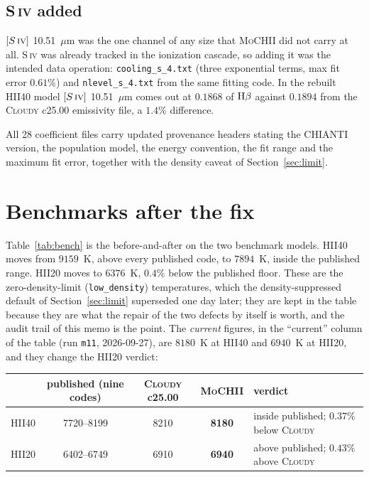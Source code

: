 \documentclass[english,a4paper]{my_memo}
\newcommand{\code}[1]{\texttt{#1}}
\newcommand{\MoCHII}{\textsc{MoCHII}}
\newcommand{\Cloudy}{\textsc{Cloudy}}
\newcommand{\SIV}{S\,\textsc{iv}}
\begin{document}
\subsection{\SIV{} added}

$[\SIV{}]$ 10.51~$\mu$m was the one channel of any size that \MoCHII{} did not
carry at all.  \SIV{} was already tracked in the ionization cascade, so adding
it was the intended data operation: \code{cooling\_s\_4.txt} (three
exponential terms, max fit error $0.61\%$) and \code{nlevel\_s\_4.txt} from
the same fitting code.  In the rebuilt HII40 model $[\SIV{}]$ 10.51~$\mu$m comes
out at $0.1868$ of ${\rm H}\beta$ against $0.1894$ from the \Cloudy{} c25.00
emissivity file, a $1.4\%$ difference.

All 28 coefficient files carry updated provenance headers stating the CHIANTI
version, the population model, the energy convention, the fit range and the
maximum fit error, together with the density caveat of
Section~\ref{sec:limit}.

\section{Benchmarks after the fix}
\label{sec:bench}

Table~\ref{tab:bench} is the before-and-after on the two benchmark models.
HII40 moves from $9159$~K, above every published code, to $7894$~K, inside the
published range.  HII20 moves to $6376$~K, $0.4\%$ below the published floor.
These are the zero-density-limit (\code{low\_density}) temperatures, which the
density-suppressed default of Section~\ref{sec:limit} superseded one day later;
they are kept in the table because they are what the repair of the two defects
by itself is worth, and the audit trail of this memo is the point.  The
\emph{current} figures, in the ``current'' column of the table (run \code{m11},
2026-09-27), are $8180$~K at HII40 and $6940$~K at HII20, and they change the
HII20 verdict:

\begin{center}
\begin{tabular}{lcccl}
\toprule
 & published (nine codes) & \Cloudy{} c25.00 & \MoCHII{} & verdict \\
\midrule
HII40 & 7720--8199 & 8210 & \textbf{8180} & inside published; $0.37\%$ below \Cloudy{} \\
HII20 & 6402--6749 & 6910 & \textbf{6940} & above published; $0.43\%$ above \Cloudy{} \\
\bottomrule
\end{tabular}
\end{center}
\end{document}
